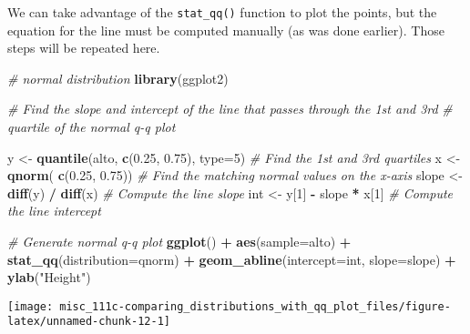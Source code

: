 \documentclass[]{book}
\newenvironment{Shaded}{\begin{snugshade}}{\end{snugshade}}
\newcommand{\CommentTok}[1]{\textcolor[rgb]{0.56,0.35,0.01}{\textit{#1}}}
\newcommand{\DataTypeTok}[1]{\textcolor[rgb]{0.13,0.29,0.53}{#1}}
\newcommand{\DecValTok}[1]{\textcolor[rgb]{0.00,0.00,0.81}{#1}}
\newcommand{\FloatTok}[1]{\textcolor[rgb]{0.00,0.00,0.81}{#1}}
\newcommand{\KeywordTok}[1]{\textcolor[rgb]{0.13,0.29,0.53}{\textbf{#1}}}
\newcommand{\NormalTok}[1]{#1}
\newcommand{\OperatorTok}[1]{\textcolor[rgb]{0.81,0.36,0.00}{\textbf{#1}}}
\newcommand{\StringTok}[1]{\textcolor[rgb]{0.31,0.60,0.02}{#1}}
\begin{document}
We can take advantage of the \texttt{stat\_qq()} function to plot the points, but the equation for the line must be computed manually (as was done earlier). Those steps will be repeated here.

\begin{Shaded}
\begin{Highlighting}[]
\CommentTok{# normal distribution}
\KeywordTok{library}\NormalTok{(ggplot2)}

\CommentTok{# Find the slope and intercept of the line that passes through the 1st and 3rd}
\CommentTok{# quartile of the normal q-q plot}

\NormalTok{y     <-}\StringTok{ }\KeywordTok{quantile}\NormalTok{(alto, }\KeywordTok{c}\NormalTok{(}\FloatTok{0.25}\NormalTok{, }\FloatTok{0.75}\NormalTok{), }\DataTypeTok{type=}\DecValTok{5}\NormalTok{) }\CommentTok{# Find the 1st and 3rd quartiles}
\NormalTok{x     <-}\StringTok{ }\KeywordTok{qnorm}\NormalTok{( }\KeywordTok{c}\NormalTok{(}\FloatTok{0.25}\NormalTok{, }\FloatTok{0.75}\NormalTok{))                 }\CommentTok{# Find the matching normal values on the x-axis}
\NormalTok{slope <-}\StringTok{ }\KeywordTok{diff}\NormalTok{(y) }\OperatorTok{/}\StringTok{ }\KeywordTok{diff}\NormalTok{(x)                     }\CommentTok{# Compute the line slope}
\NormalTok{int   <-}\StringTok{ }\NormalTok{y[}\DecValTok{1}\NormalTok{] }\OperatorTok{-}\StringTok{ }\NormalTok{slope }\OperatorTok{*}\StringTok{ }\NormalTok{x[}\DecValTok{1}\NormalTok{]                   }\CommentTok{# Compute the line intercept}

\CommentTok{# Generate normal q-q plot}
\KeywordTok{ggplot}\NormalTok{() }\OperatorTok{+}\StringTok{ }\KeywordTok{aes}\NormalTok{(}\DataTypeTok{sample=}\NormalTok{alto) }\OperatorTok{+}\StringTok{ }
\StringTok{    }\KeywordTok{stat_qq}\NormalTok{(}\DataTypeTok{distribution=}\NormalTok{qnorm) }\OperatorTok{+}\StringTok{ }
\StringTok{    }\KeywordTok{geom_abline}\NormalTok{(}\DataTypeTok{intercept=}\NormalTok{int, }\DataTypeTok{slope=}\NormalTok{slope) }\OperatorTok{+}\StringTok{ }
\StringTok{    }\KeywordTok{ylab}\NormalTok{(}\StringTok{"Height"}\NormalTok{) }
\end{Highlighting}
\end{Shaded}

\begin{center}\texttt{[image: misc\_111c-comparing\_distributions\_with\_qq\_plot\_files/figure-latex/unnamed-chunk-12-1]} \end{center}
\end{document}
